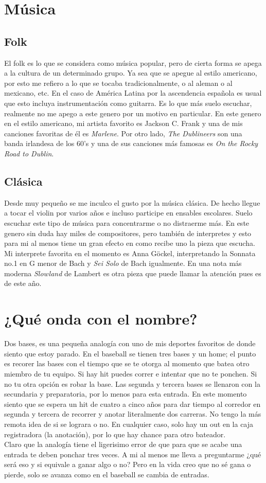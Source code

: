 \documentclass[letterpaper,12pt]{article}
\begin{document}
\section{Música}
\subsection{Folk}
\large{El folk es lo que se considera como música popular, pero de cierta forma se apega a la cultura de un determinado grupo.} \tiny{Ya sea que se apegue al estilo americano, por esto me refiero a lo que se tocaba tradicionalmente, o al aleman o al mexicano, etc. En el caso de América Latina por la ascendencia española es usual que esto incluya instrumentación como guitarra.} \large{Es lo que más suelo escuchar, realmente no me apego a este genero por un motivo en particular. 
En este genero en el estilo americano, mi artista favorito es Jackson C. Frank y una de mis canciones favoritas de él es {\it{Marlene}}. Por otro lado,  {\it{The Dublineers}} son una banda irlandesa de los 60's y una de sus canciones más famosas es {\it{On the Rocky Road to Dublin}}.} 
\subsection{Clásica}
\large{Desde muy pequeño se me inculco el gusto por la música clásica.} \tiny{De hecho llegue a tocar el violin por varios años e incluso participe en ensables escolares.} \large{Suelo escuchar este tipo de música para concentrarme o no distraerme más.} \tiny{En este genero sin duda hay miles de compositores, pero también de interpretes y esto para mi al menos tiene un gran efecto en como recibe uno la pieza que escucha.} \large{Mi interprete favorita en el momento es Anna Göckel, interpretando la Sonnata no.1 en G menor de Bach y {\it{Sei Solo}} de Bach igualmente. En una nota más moderna {\it{Slowland}} de Lambert es otra pieza que puede llamar la atención pues es de este año.}
\section{¿Qué onda con el nombre?}
\large{Dos bases, es una pequeña analogía con uno de mis deportes favoritos de donde siento que estoy parado.} \tiny{En el baseball se tienen tres bases y un home; el punto es recorer las bases con el tiempo que se te otorga al momento que batea otro miembro de tu equipo. Si hay hit puedes correr e intentar que no te ponchen. Si no tu otra opción es robar la base. Las segunda y tercera bases se llenaron con la secundaria y preparatoria, por lo menos para esta entrada. En este momento siento que se espera un hit de cuatro a cinco años para dar tiempo al corredor en segunda y tercera de recorrer y anotar literalmente dos carreras. No tengo la más remota idea de si se lograra o no. En cualquier caso, solo hay un out en la caja registradora (la anotación), por lo que hay chance para otro bateador.\\
Claro que la analogía tiene el ligerisimo error de que para que se acabe una entrada te deben ponchar tres veces. A mi al menos me lleva a preguntarme ¿qué será eso y si equivale a ganar algo o no? Pero en la vida creo que no sé gana o pierde, solo se avanza como en el baseball se cambia de entradas.}
\end{document}
